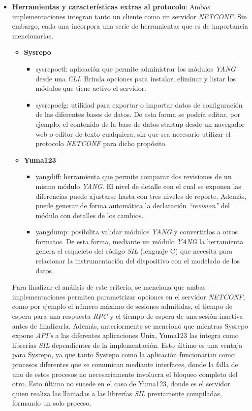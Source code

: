 \begin{itemize}
	\item \textbf{Herramientas y características extras al protocolo}: Ambas implementaciones integran tanto un cliente como un servidor \textit{NETCONF}. Sin embargo, cada una incorpora una serie de herramientas que es de importancia mencionarlas. 
	\begin{itemize}
		\item \textbf{Sysrepo}
		\begin{itemize}
			\item sysrepoctl: aplicación que permite administrar los módulos \textit{YANG} desde una \textit{CLI}. Brinda opciones para instalar, eliminar y listar los módulos que tiene activo el servidor.
			\item sysrepocfg: utilidad para exportar o importar datos de configuración de las diferentes bases de datos. De esta forma se podría editar, por ejemplo, el contenido de la base de datos startup desde un navegador web o editor de texto cualquiera, sin que sea necesario utilizar el protocolo \textit{NETCONF} para dicho propósito.
		\end{itemize}
		\item \textbf{Yuma123}
		\begin{itemize}
			\item yangdiff: herramienta que permite comparar dos revisiones de un mismo módulo \textit{YANG}. El nivel de detalle con el cual se exponen las diferencias puede ajustarse hasta con tres niveles de reporte. Además, puede generar de forma automática la declaración \textit{“revision”} del módulo con detalles de los cambios.
			\item yangdump: posibilita validar módulos \textit{YANG} y convertirlos a otros formatos. De esta forma, mediante un módulo \textit{YANG} la herramienta genera el esqueleto del código \textit{SIL} (lenguaje C) que necesita para relacionar la instrumentación del dispositivo con el modelado de los datos.
		\end{itemize}
	\end{itemize}

	Para finalizar el análisis de este criterio, se menciona que ambas implementaciones permiten parametrizar opciones en el servidor \textit{NETCONF}, como por ejemplo el número máximo de sesiones admitidas, el tiempo de espera para una respuesta \textit{RPC} y el tiempo de espera de una sesión inactiva antes de finalizarla. Además, anteriormente se mencionó que mientras Sysrepo expone \textit{API’s} a las diferentes aplicaciones Unix, Yuma123 las integra como librerías \textit{SIL} dependientes de la implementación. Esto último es una ventaja para Sysrepo, ya que tanto Sysrepo como la aplicación funcionarían como procesos diferentes que se comunican mediante interfaces, donde la falla de uno de estos procesos no necesariamente involucra el bloqueo completo del otro. Esto último no sucede en el caso de Yuma123, donde es el servidor quien realiza las llamadas a las librerías \textit{SIL} previamente compiladas, formando un solo proceso.


\end{itemize}
